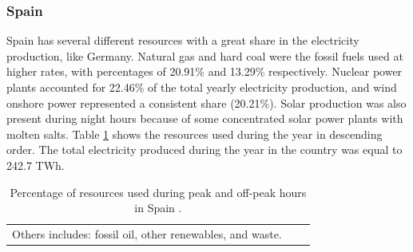 {{%
\subsubsection{Spain}

Spain has several different resources with a great share in the electricity production, like Germany.
 Natural gas and hard coal were the fossil fuels used at higher rates, with percentages of 20.91\% and 13.29\% respectively. Nuclear power plants accounted for 22.46\% of the total yearly electricity production, and  wind onshore power represented a consistent share (20.21\%).  Solar production was also present  during night hours because of some concentrated solar power plants with molten salts. Table \ref{RES_ES} shows the resources used during the year in descending order. The total electricity produced during the year in the country was equal to 242.7 TWh.

 \begin{table}[]
\centering
\caption{Percentage of resources used during peak and off-peak hours in Spain \cite{Entso-eProduction}.}
\label{RES_ES}
\begin{tabular}{ccc}
\multicolumn{1}{c}{\footnotesize*Others includes: fossil oil, other renewables, and waste.}
\end{tabular}

\end{table}



}}

